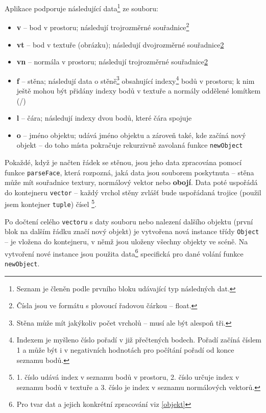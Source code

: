 \documentclass[a4paper, 11pt]{report}
\begin{document}
Aplikace podporuje následující data\footnote{Seznam je členěn podle prvního bloku udávající typ následných dat.} ze souboru:
\begin{itemize}
    \item \textbf{v} -- bod v prostoru; následují trojrozměrné souřadnice\footnote{\label{float}Čísla jsou ve formátu s plovoucí řadovou čárkou -- float.}
    \item \textbf{vt} -- bod v textuře (obrázku); následují dvojrozměrné souřadnice\cref{float}
    \item \textbf{vn} -- normála v prostoru; následují trojrozměrné souřadnice\cref{float}
    \item \textbf{f} -- stěna; následují data o stěně\footnote{Stěna může mít jakýkoliv počet vrcholů -- musí ale být alespoň tři.} obsahující indexy\footnote{Indexem je myšleno číslo pořadí v již přečtených bodech. Pořadí začíná číslem 1 a může být i v negativních hodnotách pro počítání pořadí od konce seznamu bodů.} bodů v prostoru; k nim ještě mohou být přidány indexy bodů v textuře a normály oddělené lomítkem (/)
    \item \textbf{l} -- čára; následují indexy dvou bodů, které čára spojuje
    \item \textbf{o} -- jméno objektu; udává jméno objektu a zároveň také, kde začíná nový objekt -- do toho místa pokračuje rekurzivně zavolaná funkce \texttt{newObject}
\end{itemize}

Pokaždé, když je načten řádek se stěnou, jsou jeho data zpracována pomocí funkce \texttt{parseFace}, která rozpozná, jaká data jsou souborem poskytnuta -- stěna může mít souřadnice textury, normálový vektor nebo \textbf{obojí}. Data poté uspořádá do kontejneru \texttt{vector} -- každý vrchol stěny zvlášť bude uspořádaná trojice (použil jsem kontejner \texttt{tuple}) čísel \footnote{1. číslo udává index v seznamu bodů v prostoru, 2. číslo určuje index v seznamu bodů v textuře a 3. číslo je index v seznamu normálových vektorů.}.

Po dočtení celého \texttt{vectoru} s daty souboru nebo nalezení dalšího objektu (první blok na dalším řádku značí nový objekt) je vytvořena nová instance třídy \texttt{Object} -- je vložena do kontejneru, v němž jsou uloženy všechny objekty ve scéně. Na vytvoření nové instance jsou použita data\footnote{Pro tvar dat a jejich konkrétní zpracování viz \ref{objekt}} specifická pro dané volání funkce \texttt{newObject}.
\end{document}
